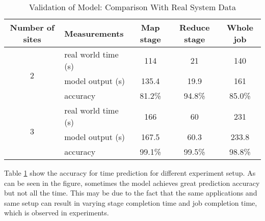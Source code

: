 \documentclass[base.tex]{subfiles}
\begin{document}
\begin{table}[htbp]
\centering
\caption{Validation of Model: Comparison With Real System Data}
\label{tbl: Validation}
\begin{tabular}{|c|l|c|c|c|}
\hline
Number of sites    & Measurements        & Map stage & Reduce stage & Whole job \\ \hline
\multirow{3}{*}{2} & real world time (s) & 114       & 21           & 140       \\ \cline{2-5} 
                   & model output (s)    & 135.4     & 19.9         & 161       \\ \cline{2-5} 
                   & accuracy            & 81.2\%    & 94.8\%       & 85.0\%    \\ \hline
\multirow{3}{*}{3} & real world time (s) & 166       & 60           & 231       \\ \cline{2-5} 
                   & model output (s)    & 167.5     & 60.3         & 233.8     \\ \cline{2-5} 
                   & accuracy            & 99.1\%    & 99.5\%       & 98.8\%    \\ \hline
\end{tabular}
\end{table}

Table \ref{tbl: Validation} show the accuracy for time prediction for different experiment setup. As can be seen in the figure, sometimes the model achieves great prediction accuracy but not all the time. This may be due to the fact that the same applications and same setup can result in varying stage completion time and job completion time, which is observed in experiments.
\end{document}
